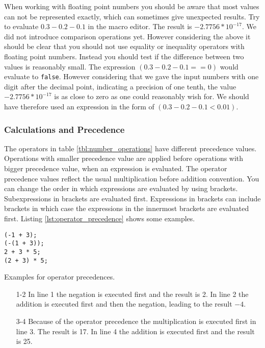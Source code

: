 When working with floating point numbers you should be aware that most values can not be represented exactly, which can sometimes give unexpected results. Try to evaluate $0.3 - 0.2 - 0.1$ in the macro editor. The result is $-2.7756 * 10^ {-17}$. We did not introduce comparison operations yet. However considering the above it should be clear that you should not use equality or inequality operators with floating point numbers. Instead you should test if the difference between two values is reasonably small. The expression $ (0.3 - 0.2 - 0.1 == 0)$ would evaluate to {\tt false}. However considering that we gave the input numbers with one digit after the decimal point, indicating a precision of one tenth, the value $-2.7756 * 10^ {-17}$ is as close to zero as one could reasonably wish for. We should have therefore used an expression in the form of $ (0.3 - 0.2 - 0.1 < 0.01)$. 

\subsubsection{Calculations and Precedence}

The operators in table \ref{tbl:number_operations} have different precedence values. Operations with smaller precedence value are applied before operations with bigger precedence value, when an expression is evaluated. The operator precedence values reflect the usual multiplication before addition convention. You can change the order in which expressions are evaluated by using brackets. Subexpressions in brackets are evaluated first. Expressions in brackets can include brackets in which case the expressions in the innermost brackets are evaluated first. Listing \ref{lst:operator_precedence} shows some examples.

\begin{listing}[H]
\begin{verbatim}
(-1 + 3);
(-(1 + 3));
2 + 3 * 5;
(2 + 3) * 5;
\end{verbatim}
\caption{Examples for operator precedences.}
\label{lst:operator_precedence}
\end{listing}

\begin{enumerate}
\item[1-2] 	In line 1 the negation is executed first and the result is 2. In line 2 the addition is executed first and then the negation, leading to the result $-4$.
\item[3-4] Because of the operator precedence the multiplication is executed first in line 3. The result is 17. In line 4 the addition is executed first and the result is 25.
\end{enumerate}

